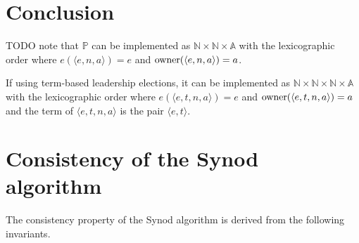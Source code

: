 \documentclass[journal]{IEEEtran}
\begin{document}




\section{Conclusion}

TODO note that $\mathbb P$ can be implemented as $\mathbb N \times \mathbb N
\times \mathbb A$ with the lexicographic order where $e(\langle e, n, a
\rangle) = e$ and $\mathrm{owner}(\langle e, n, a\rangle) = a$.

If using term-based leadership elections, it can be implemented as $\mathbb N
\times \mathbb N \times \mathbb N \times \mathbb A$ with the lexicographic
order where $e(\langle e, t, n, a \rangle) = e$ and $\mathrm{owner}(\langle e, t, n,
a\rangle) = a$ and the term of $\langle e, t, n, a \rangle$ is the pair
$\langle e, t \rangle$.


\pagebreak

\appendices
\section{Consistency of the Synod algorithm}
\label{synod-safety}

The consistency property of the Synod algorithm is derived from the following
invariants.
\end{document}
